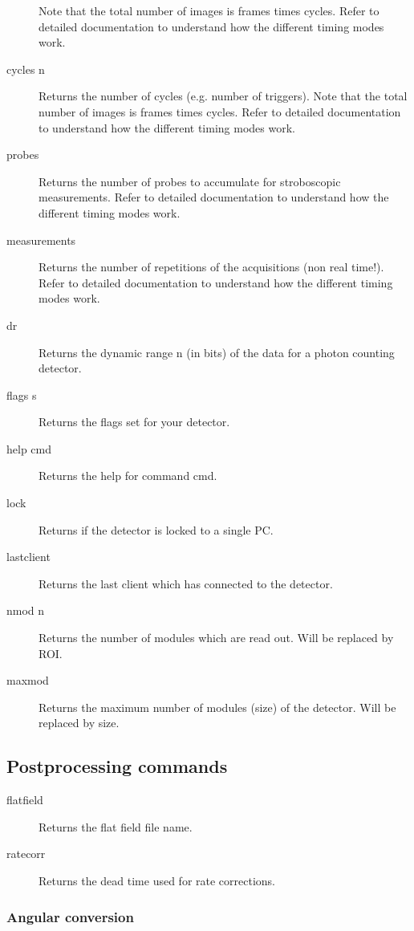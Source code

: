 \documentclass{article}
\begin{document}
\begin{description}
Note that the total number of images is  frames times cycles.  
Refer to detailed documentation to understand how the different timing modes work. 
\item[cycles n] 
Returns the number of cycles (e.g. number of triggers). 
Note that the total number of images is  frames times cycles. 
Refer to detailed documentation to understand how the different timing modes work.  
\item[probes]  Returns the number of probes to accumulate for stroboscopic measurements.  
Refer to detailed documentation to understand how the different timing modes work.
\item[measurements] Returns the number of repetitions of the acquisitions (non real time!). 
Refer to detailed documentation to understand how the different timing modes work.
\item[dr] Returns the dynamic range n (in bits) of the data for a photon counting detector. 
\item[flags s] Returns the flags set for your detector. 
\item[help cmd]  Returns the help for command cmd.
\item[lock] Returns if the detector is locked to a single PC.
\item[lastclient] Returns the last client which has connected to the detector.
\item[nmod n] Returns the number of modules which are read out. Will be replaced by ROI.
\item[maxmod] Returns the maximum number of modules (size) of the detector.  Will be replaced by size.
\end{description}








\subsection{Postprocessing commands}
\begin{description}      
\item[flatfield] Returns the flat field file name. 
\item[ratecorr] Returns the dead time used for rate corrections.
\end{description}


\subsubsection{Angular conversion}
\end{document}
